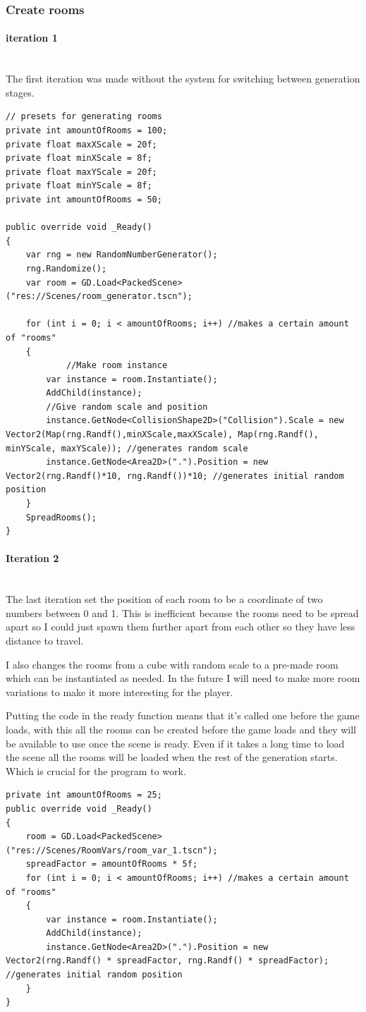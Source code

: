 \documentclass{article}
\newcommand{\parBr}{\vspace{5mm}}%
\newcommand{\myparagraph}[1]{\paragraph{#1}\mbox{}\\} %
\begin{document}
\subsubsection{Create rooms}
\myparagraph{iteration 1}
The first iteration was made without the system for switching between generation stages.
\begin{lstlisting}
// presets for generating rooms
private int amountOfRooms = 100;
private float maxXScale = 20f;
private float minXScale = 8f;
private float maxYScale = 20f;
private float minYScale = 8f;
private int amountOfRooms = 50;

public override void _Ready()
{
    var rng = new RandomNumberGenerator();
    rng.Randomize();
    var room = GD.Load<PackedScene>("res://Scenes/room_generator.tscn");

    for (int i = 0; i < amountOfRooms; i++) //makes a certain amount of "rooms"
    {
    	    //Make room instance
        var instance = room.Instantiate();
        AddChild(instance);
        //Give random scale and position
        instance.GetNode<CollisionShape2D>("Collision").Scale = new Vector2(Map(rng.Randf(),minXScale,maxXScale), Map(rng.Randf(), minYScale, maxYScale)); //generates random scale
        instance.GetNode<Area2D>(".").Position = new Vector2(rng.Randf()*10, rng.Randf())*10; //generates initial random position
    }
    SpreadRooms();
}
\end{lstlisting}

\myparagraph{Iteration 2}
The last iteration set the position of each room to be a coordinate of two numbers between 0 and 1. This is inefficient because the rooms need to be spread apart so I could just spawn them further apart from each other so they have less distance to travel.

\parBr

I also changes the rooms from a cube with random scale to a pre-made room which can be instantiated as needed. In the future I will need to make more room variations to make it more interesting for the player. 

\parBr

Putting the code in the ready function means that it's called one before the game loads, with this all the rooms can be created before the game loads and they will be available to use once the scene is ready. Even if it takes a long time to load the scene all the rooms will be loaded when the rest of the generation starts. Which is crucial for the program to work.
\begin{lstlisting}
private int amountOfRooms = 25;
public override void _Ready()
{
	room = GD.Load<PackedScene>("res://Scenes/RoomVars/room_var_1.tscn");
	spreadFactor = amountOfRooms * 5f;
	for (int i = 0; i < amountOfRooms; i++) //makes a certain amount of "rooms"
	{
    	var instance = room.Instantiate();
    	AddChild(instance);
    	instance.GetNode<Area2D>(".").Position = new Vector2(rng.Randf() * spreadFactor, rng.Randf() * spreadFactor); //generates initial random position
	}
}
\end{lstlisting}
\end{document}
